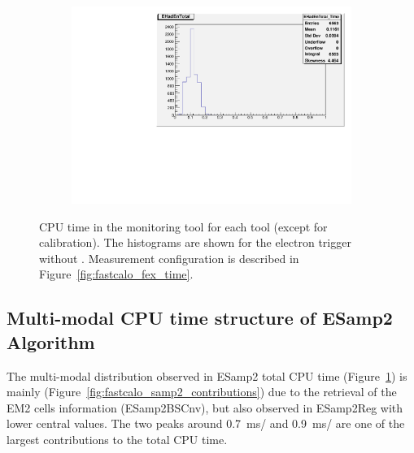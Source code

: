 \begin{figure}[ht]
\begin{subfigure}[c]{.48\textwidth}
\centering
\end{subfigure}
\begin{subfigure}[c]{.48\textwidth}
\includegraphics[width=\textwidth]{appendices/figures/fastcalo_time/ehadtotal.pdf}
\centering
\end{subfigure}
\caption{CPU time in the monitoring tool for each \fastcalo tool (except for
calibration). The histograms are shown for the electron trigger without \rnn.
Measurement configuration is described in Figure~\ref{fig:fastcalo_fex_time}.}%
\label{fig:fastcalo_fex_tools_time}
\end{figure}

\subsection{Multi-modal CPU time structure of ESamp2 Algorithm}\label{ssec:esamp2}

The multi-modal distribution observed in ESamp2 total CPU time
(Figure~\ref{fig:fastcalo_fex_tools_time}) is mainly
(Figure~\ref{fig:fastcalo_samp2_contributions}) due to the retrieval of
the EM2 cells information (ESamp2BSCnv), but also observed in ESamp2Reg with
lower central values. The two peaks around \SI{0.7}{\ms/} and
\SI{0.9}{\ms/} are one of the largest contributions to the total
\fastcalo CPU time.


